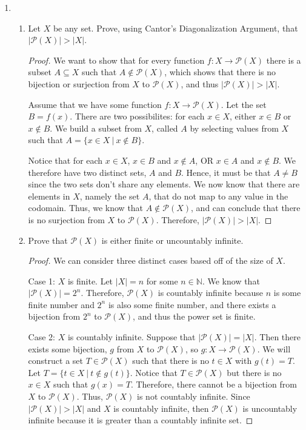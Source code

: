 \documentclass[12pt]{article}
\newcommand{\N}{\mathbb{N}}
\begin{document}
\begin{enumerate}
\begin{enumerate}
\end{enumerate}

\item \begin{enumerate}
\item Let $X$ be any set. Prove, using Cantor's Diagonalization Argument, that $|\mathcal{P}(X)|>|X|$.

\begin{proof}
We want to show that for every function $f:X \to \mathcal{P}(X)$ there is a subset $A \subseteq X$ such that $A \notin \mathcal{P}(X)$, which shows that there is no bijection or surjection from $X$ to $\mathcal{P}(X)$, and thus $|\mathcal{P}(X)|>|X|$. 

Assume that we have some function $f:X \to \mathcal{P}(X)$. Let the set $B = f(x)$. There are two possibilites: for each $x \in X$, either $x \in B$ or $x \notin B$. We build a subset from $X$, called $A$ by selecting values from $X$ such that $A = \{x \in X\ |\ x \notin B\}$.

Notice that for each $x \in X$, $x\in B$ and $x \notin A$, OR $x\in A$ and $x \notin B$. We therefore have two distinct sets, $A$ and $B$. Hence, it must be that $A \neq B$ since the two sets don't share any elements. We now know that there are elements in $X$, namely the set $A$, that do not map to any value in the codomain. Thus, we know that $A \notin \mathcal{P}(X)$, and can conclude that there is no surjection from $X$ to $\mathcal{P}(X)$. Therefore, $|\mathcal{P}(X)|>|X|$. 
\end{proof}

\item Prove that $\mathcal{P}(X)$ is either finite or uncountably infinite.
\begin{proof}
We can consider three distinct cases based off of the size of $X$. 

Case 1: $X$ is finite. Let $|X| = n$ for some $n \in \N$. We know that $|\mathcal{P}(X)| = 2^n$. Therefore, $\mathcal{P}(X)$ is countably infinite because $n$ is some finite number and $2^n$ is also some finite number, and there exists a bijection from $2^n$ to $\mathcal{P}(X)$, and thus the power set is finite. 

Case 2: $X$ is countably infinite. Suppose that $|\mathcal{P}(X)| = |X|$. Then there exists some bijection, $g$ from $X$ to $\mathcal{P}(X)$, so $g:X \to \mathcal{P}(X)$. We will construct a set $T \in \mathcal{P}(X)$ such that there is no $t \in X$ with $g(t) = T$. Let $T = \{t \in X\ |\ t \notin g(t)\}$. Notice that $T \in \mathcal{P}(X)$ but there is no $x \in X$ such that $g(x) = T$. Therefore, there cannot be a bijection from $X$ to $\mathcal{P}(X)$. Thus, $\mathcal{P}(X)$ is not countably infinite. Since $|\mathcal{P}(X)| > |X|$ and $X$ is countably infinite, then $\mathcal{P}(X)$ is uncountably infinite because it is greater than a countably infinite set. 


\end{proof}
\end{enumerate}
\end{enumerate}
\end{document}
